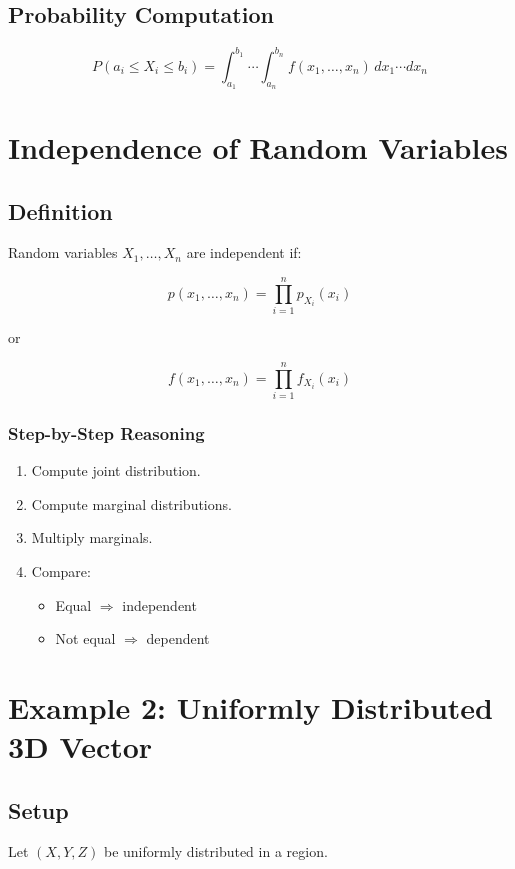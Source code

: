 \documentclass[12pt]{article}
\begin{document}
\subsection{Probability Computation}

\[
P(a_i \le X_i \le b_i) =
\int_{a_1}^{b_1} \cdots \int_{a_n}^{b_n}
f(x_1,\dots,x_n)\, dx_1 \cdots dx_n
\]

\section{Independence of Random Variables}

\subsection{Definition}

Random variables $X_1,\dots,X_n$ are independent if:

\[
p(x_1,\dots,x_n) =
\prod_{i=1}^{n} p_{X_i}(x_i)
\]

or

\[
f(x_1,\dots,x_n) =
\prod_{i=1}^{n} f_{X_i}(x_i)
\]

\subsubsection*{Step-by-Step Reasoning}

\begin{enumerate}
\item Compute joint distribution.
\item Compute marginal distributions.
\item Multiply marginals.
\item Compare:
\begin{itemize}
\item Equal $\Rightarrow$ independent
\item Not equal $\Rightarrow$ dependent
\end{itemize}
\end{enumerate}

\section{Example 2: Uniformly Distributed 3D Vector}

\subsection{Setup}

Let $(X,Y,Z)$ be uniformly distributed in a region.
\end{document}
